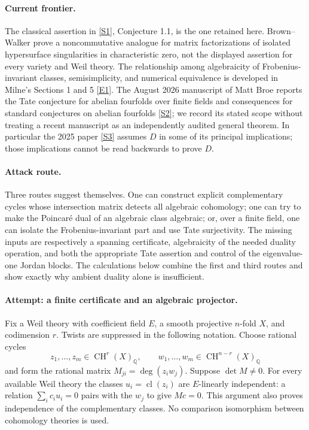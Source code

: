 \documentclass[11pt,a4paper]{article}
\newcommand{\Q}{\mathbb{Q}}
\newcommand{\sref}[2]{\hyperlink{source:#1:#2}{[S#2]}}
\newcommand{\eref}[2]{\hyperlink{extra:#1:#2}{[E#2]}}
\numberwithin{equation}{section}
\begin{document}
\paragraph{Current frontier.}
The classical assertion in \sref{44}{1}, Conjecture 1.1, is the one
retained here. Brown--Walker prove a noncommutative analogue for matrix
factorizations of isolated hypersurface singularities in characteristic
zero, not the displayed assertion for every variety and Weil theory.
The relationship among algebraicity of Frobenius-invariant classes,
semisimplicity, and numerical equivalence is developed in Milne's
Sections 1 and 5 \eref{44}{1}. The August 2026 manuscript of Matt Broe
reports the Tate conjecture for abelian fourfolds over finite fields and
consequences for standard conjectures on abelian fourfolds \sref{44}{2};
we record its stated scope without treating a recent manuscript as an
independently audited general theorem. In particular the 2025 paper
\sref{44}{3} assumes $D$ in some of its principal implications; those
implications cannot be read backwards to prove $D$.

\paragraph{Attack route.}
Three routes suggest themselves. One can construct explicit complementary
cycles whose intersection matrix detects all algebraic cohomology; one
can try to make the Poincar\'e dual of an algebraic class algebraic; or,
over a finite field, one can isolate the Frobenius-invariant part and use
Tate surjectivity. The missing inputs are respectively a spanning
certificate, algebraicity of the needed duality operation, and both the
appropriate Tate assertion and control of the eigenvalue-one Jordan
blocks. The calculations below combine the first and third routes and
show exactly why ambient duality alone is insufficient.

\paragraph{Attempt: a finite certificate and an algebraic projector.}
Fix a Weil theory with coefficient field $E$, a smooth projective $n$-fold
$X$, and codimension $r$. Twists are suppressed in the following notation.
Choose rational cycles
\[
 z_1,\ldots,z_m\in\operatorname{CH}^r(X)_{\Q},\qquad
 w_1,\ldots,w_m\in\operatorname{CH}^{n-r}(X)_{\Q}
\]
and form the rational matrix $M_{ji}=\deg(z_iw_j)$. Suppose
$\det M\ne0$. For every available Weil theory the classes
$u_i=\operatorname{cl}(z_i)$ are $E$-linearly independent: a relation
$\sum_i c_i u_i=0$ pairs with the $w_j$ to give $Mc=0$.
This argument also proves independence of the complementary classes.
No comparison isomorphism between cohomology theories is used.
\end{document}
